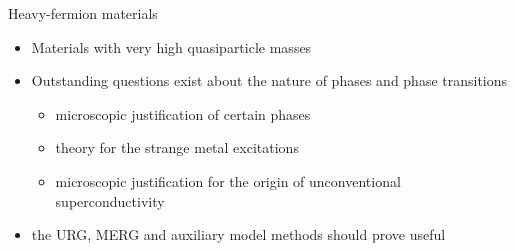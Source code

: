 \documentclass[8pt,aspectratio=169]{beamer}
\newcommand{\nitem}{\item[\ding{51}]}
\begin{document}
\begin{frame}{Heavy-fermion materials}
\begin{itemize}
	\nitem Materials with very high quasiparticle masses\\[20pt]
	\nitem Outstanding questions exist about the nature of phases and phase transitions
		\begin{itemize}
			\nitem microscopic justification of certain phases
			\nitem theory for the strange metal excitations
			\nitem microscopic justification for the origin of unconventional superconductivity\\[20pt]
		\end{itemize}
	\nitem the URG, MERG and auxiliary model methods should prove useful
\end{itemize}
\end{frame}
\end{document}
